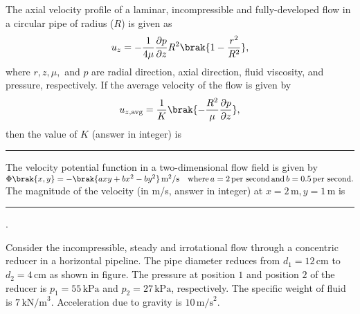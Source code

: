 \iffalse
\chapter{2024}
\author{EE24BTECH11015 - Dhawal}
\section{xe}
\fi


\item The axial velocity profile of a laminar, incompressible and fully-developed flow in a circular pipe of radius ($ R $) is given as 
\begin{align*}
    u_z = -\frac{1}{4\mu} \frac{\partial p}{\partial z} R^2 \brak{ 1 - \frac{r^2}{R^2} },
\end{align*}  
where $r, z, \mu, $ and $ p $ are radial direction, axial direction, fluid viscosity, and pressure, respectively. If the average velocity of the flow is given by 
\begin{align*}
    u_{z,\text{avg}} = \frac{1}{K} \brak{ -\frac{R^2}{\mu} \frac{\partial p}{\partial z} }, 
\end{align*} 
then the value of $ K $ (answer in integer) is 
 \rule{1cm}{0.4 pt}


\item The velocity potential function in a two-dimensional flow field is given by\\
$ \Phi\brak{x, y} = -\brak{axy + bx^2 - by^2} \, \text{m}^2/\text{s} \quad \text{where} \, a = 2 \, \text{per second} \, \text{and} \, b = 0.5 \, \text{per second}. $
The magnitude of the velocity (in m/s, answer in integer) at $ x = 2 \, \text{m}, y = 1 \, \text{m} $ is \rule{1cm}{0.4 pt}.



\item Consider the incompressible, steady and irrotational flow through a concentric reducer in a horizontal pipeline. The pipe diameter reduces from $ d_1 = 12 \, \text{cm} $ to $ d_2 = 4 \, \text{cm} $ as shown in figure. The pressure at position $1$ and position $2$ of the reducer is $ p_1 = 55 \, \text{kPa} $ and $ p_2 = 27 \, \text{kPa}$, respectively. The specific weight of fluid is $ 7 \, \text{kN/m}^3 $. Acceleration due to gravity is $ 10 \, \text{m/s}^2 $.

